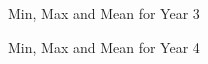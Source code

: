 \begin{figure}[htp]
\centering
{}
\caption{Min, Max and Mean for Year 3 }
\label{fig:y1mmm}
\end{figure}


\begin{figure}[htp]
\centering
{}
\caption{Min, Max and Mean for Year 4 }
\label{fig:y1mmm}
\end{figure}


